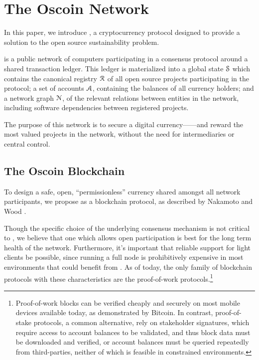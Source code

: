 \section{The Oscoin Network}
\label{s:oscoin}

\noindent In this paper, we introduce \oscoin{}, a cryptocurrency protocol
designed to provide a solution to the open source sustainability problem.

\Oscoin{} is a public network of computers participating in a consensus
protocol around a shared transaction ledger.
This ledger is materialized into a global state $\mathcal{S}$ which
contains the canonical registry $\mathcal{R}$ of all open source
projects participating in the protocol; a set of accounts
$\mathcal{A}$, containing the balances of all currency holders; and
a network graph $\mathcal{N}$, of the relevant relations between
entities in the network, including software dependencies between registered projects.

The purpose of this network is to secure a digital currency---\oscoin{}---and
reward the most valued projects in the network, without the need
for intermediaries or central control.

\subsection{The Oscoin Blockchain}

To design a safe, open, ``permissionless'' currency shared amongst all network
participants, we propose \oscoin{} as a blockchain protocol, as
described by Nakamoto \cite{bitcoin} and Wood \cite{ethereum}.

Though the specific choice of the underlying consensus mechanism is not
critical to \oscoin{}, we believe that one which allows open
participation is best for the long term health of the network. Furthermore,
it's important that reliable support for light clients be possible, since
running a full node is prohibitively expensive in most environments that could
benefit from \oscoin{}. As of today, the only family of blockchain protocols with these
characteristics are the proof-of-work protocols.\footnote{Proof-of-work blocks
can be verified cheaply and securely on most mobile devices available
today, as demonstrated by Bitcoin. In contrast, proof-of-stake protocols,
a common alternative, rely on stakeholder signatures, which require access to
account balances to be validated, and thus block data must be downloaded and
verified, or account balances must be queried repeatedly from third-parties,
neither of which is feasible in constrained environments.}

